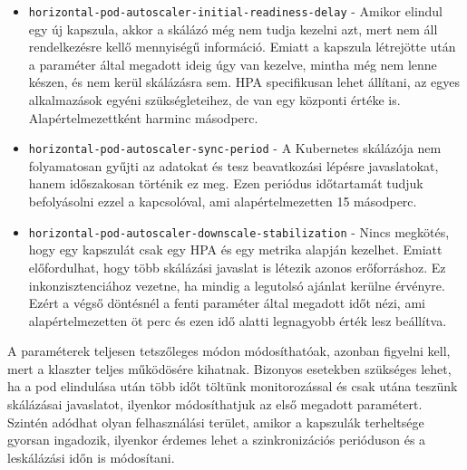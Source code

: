 \begin{itemize}
	\item \verb+horizontal-pod-autoscaler-initial-readiness-delay+ - Amikor elindul egy új kapszula, akkor a skálázó még nem tudja kezelni azt, mert nem áll rendelkezésre kellő mennyiségű információ. Emiatt a kapszula létrejötte után a paraméter által megadott ideig úgy van kezelve, mintha még nem lenne készen, és nem kerül skálázásra sem. HPA specifikusan lehet állítani, az egyes alkalmazások egyéni szükségleteihez, de van egy központi értéke is. Alapértelmezettként harminc másodperc. 

	\item \verb+horizontal-pod-autoscaler-sync-period+ - A Kubernetes skálázója nem folyamatosan gyűjti az adatokat és tesz beavatkozási lépésre javaslatokat, hanem időszakosan történik ez meg. Ezen periódus időtartamát tudjuk befolyásolni ezzel a kapcsolóval, ami alapértelmezetten 15 másodperc. 
	
	\item \verb+horizontal-pod-autoscaler-downscale-stabilization+ - Nincs megkötés, hogy egy kapszulát csak egy HPA és egy metrika alapján kezelhet. Emiatt előfordulhat, hogy több skálázási javaslat is létezik azonos erőforráshoz. Ez inkonzisztenciához vezetne, ha mindig a legutolsó ajánlat kerülne érvényre. Ezért a végső döntésnél a fenti paraméter által megadott időt nézi, ami alapértelmezetten öt perc és ezen idő alatti legnagyobb érték lesz beállítva.
\end{itemize}

A paraméterek teljesen tetszőleges módon módosíthatóak, azonban figyelni kell, mert a klaszter teljes működösére kihatnak.
Bizonyos esetekben szükséges lehet, ha a pod elindulása után több időt töltünk monitorozással és csak utána teszünk skálázásai javaslatot, ilyenkor módosíthatjuk az első megadott paramétert.
Szintén adódhat olyan felhasználási terület, amikor a kapszulák terheltsége gyorsan ingadozik, ilyenkor érdemes lehet a szinkronizációs perióduson és a leskálázási időn is módosítani.
